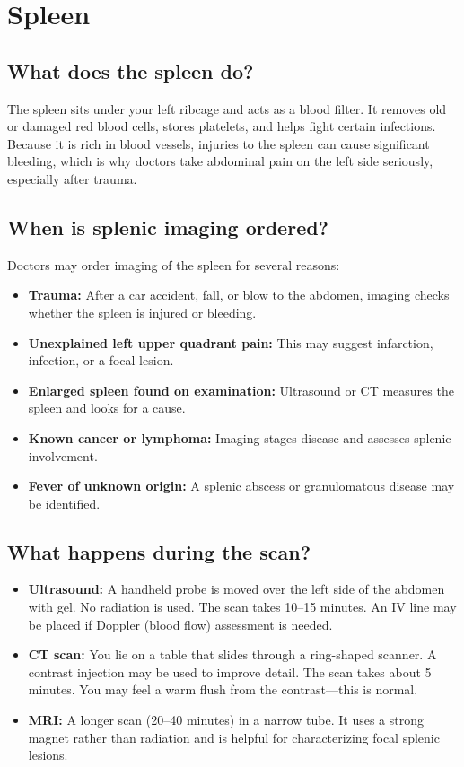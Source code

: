\chapter{Spleen}

\label{ch:ch48_spleen}

\section{What does the spleen do?}
The spleen sits under your left ribcage and acts as a blood filter. It removes old or damaged red blood cells, stores platelets, and helps fight certain infections. Because it is rich in blood vessels, injuries to the spleen can cause significant bleeding, which is why doctors take abdominal pain on the left side seriously, especially after trauma.

\section{When is splenic imaging ordered?}
Doctors may order imaging of the spleen for several reasons:
\begin{itemize}
    \item \textbf{Trauma:} After a car accident, fall, or blow to the abdomen, imaging checks whether the spleen is injured or bleeding.
    \item \textbf{Unexplained left upper quadrant pain:} This may suggest infarction, infection, or a focal lesion.
    \item \textbf{Enlarged spleen found on examination:} Ultrasound or CT measures the spleen and looks for a cause.
    \item \textbf{Known cancer or lymphoma:} Imaging stages disease and assesses splenic involvement.
    \item \textbf{Fever of unknown origin:} A splenic abscess or granulomatous disease may be identified.
\end{itemize}

\section{What happens during the scan?}
\begin{itemize}
    \item \textbf{Ultrasound:} A handheld probe is moved over the left side of the abdomen with gel. No radiation is used. The scan takes 10--15 minutes. An IV line may be placed if Doppler (blood flow) assessment is needed.
    \item \textbf{CT scan:} You lie on a table that slides through a ring-shaped scanner. A contrast injection may be used to improve detail. The scan takes about 5 minutes. You may feel a warm flush from the contrast---this is normal.
    \item \textbf{MRI:} A longer scan (20--40 minutes) in a narrow tube. It uses a strong magnet rather than radiation and is helpful for characterizing focal splenic lesions.
\end{itemize}

